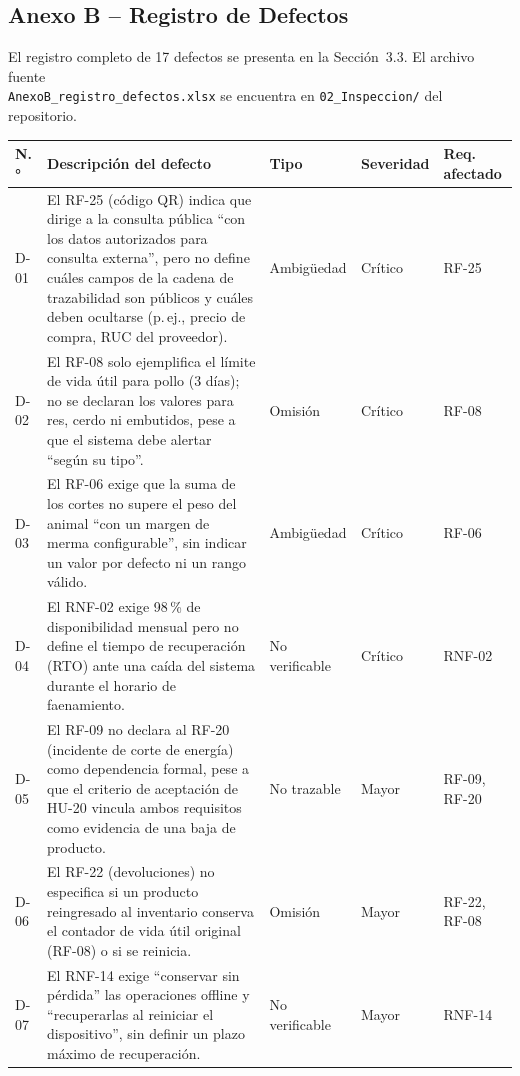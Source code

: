 \documentclass[11pt,a4paper]{article}
\begin{document}
\subsection*{Anexo B -- Registro de Defectos}
El registro completo de 17 defectos se presenta en la Sección~3.3. El archivo fuente \\
\texttt{AnexoB\_registro\_defectos.xlsx} se encuentra en \texttt{02\_Inspeccion/} del repositorio.

\begin{longtable}{|p{0.8cm}|p{4.9cm}|p{2cm}|p{1.6cm}|p{2.2cm}|}
\hline
\textbf{N.°} & \textbf{Descripción del defecto} & \textbf{Tipo} & \textbf{Severidad} & \textbf{Req. afectado} \\
\hline
\endhead
D-01 & El RF-25 (código QR) indica que dirige a la consulta pública “con los datos autorizados para consulta externa”, pero no define cuáles campos de la cadena de trazabilidad son públicos y cuáles deben ocultarse (p.\,ej., precio de compra, RUC del proveedor). & Ambigüedad & Crítico & RF-25 \\
\hline
D-02 & El RF-08 solo ejemplifica el límite de vida útil para pollo (3 días); no se declaran los valores para res, cerdo ni embutidos, pese a que el sistema debe alertar “según su tipo”. & Omisión & Crítico & RF-08 \\
\hline
D-03 & El RF-06 exige que la suma de los cortes no supere el peso del animal “con un margen de merma configurable”, sin indicar un valor por defecto ni un rango válido. & Ambigüedad & Crítico & RF-06 \\
\hline
D-04 & El RNF-02 exige 98\,\% de disponibilidad mensual pero no define el tiempo de recuperación (RTO) ante una caída del sistema durante el horario de faenamiento. & No verificable & Crítico & RNF-02 \\
\hline
D-05 & El RF-09 no declara al RF-20 (incidente de corte de energía) como dependencia formal, pese a que el criterio de aceptación de HU-20 vincula ambos requisitos como evidencia de una baja de producto. & No trazable & Mayor & RF-09, RF-20 \\
\hline
D-06 & El RF-22 (devoluciones) no especifica si un producto reingresado al inventario conserva el contador de vida útil original (RF-08) o si se reinicia. & Omisión & Mayor & RF-22, RF-08 \\
\hline
D-07 & El RNF-14 exige “conservar sin pérdida” las operaciones offline y “recuperarlas al reiniciar el dispositivo”, sin definir un plazo máximo de recuperación. & No verificable & Mayor & RNF-14 \\

\end{longtable}
\end{document}
